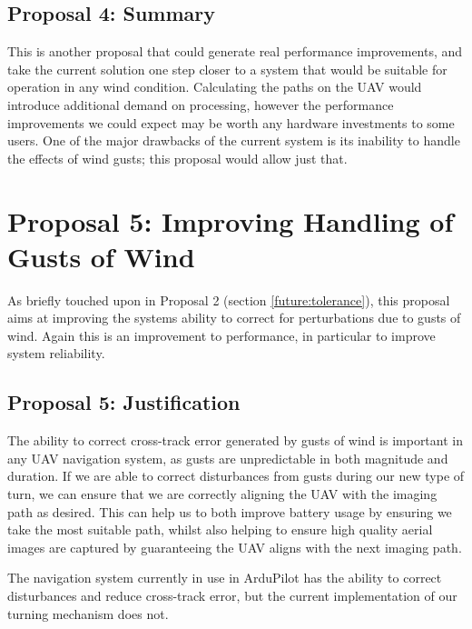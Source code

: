 \subsection{Proposal 4: Summary} 
\label{future:onboardsummary}

This is another proposal that could generate real performance improvements, and take the current solution one step closer to a system that would be suitable for operation in any wind condition. Calculating the paths on the UAV would introduce additional demand on processing, however the performance improvements we could expect may be worth any hardware investments to some users. One of the major drawbacks of the current system is its inability to handle the effects of wind gusts; this proposal would allow just that. 

\section{Proposal 5: Improving Handling of Gusts of Wind} 
\label{future:gusts}

As briefly touched upon in Proposal 2 (section \ref{future:tolerance}), this proposal aims at improving the systems ability to correct for perturbations due to gusts of wind. Again this is an improvement to performance, in particular to improve system reliability. 

\subsection{Proposal 5: Justification}
\label{future:gustsreason}

The ability to correct cross-track error generated by gusts of wind is important in any UAV navigation system, as gusts are unpredictable in both magnitude and duration. If we are able to correct disturbances from gusts during our new type of turn, we can ensure that we are correctly aligning the UAV with the imaging path as desired. This can help us to both improve battery usage by ensuring we take the most suitable path, whilst also helping to ensure high quality aerial images are captured by guaranteeing the UAV aligns with the next imaging path. 

The navigation system currently in use in ArduPilot has the ability to correct disturbances and reduce cross-track error, but the current implementation of our turning mechanism does not. 


